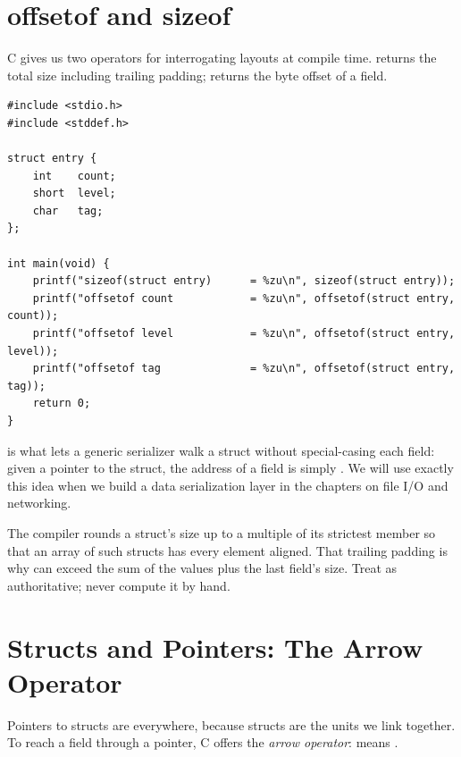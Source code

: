 \section{offsetof and sizeof}

C gives us two operators for interrogating layouts at compile time.
 returns the total size including trailing padding;
 returns the byte offset of a field.

\begin{lstlisting}[caption={Reading the layout without guessing.}]
#include <stdio.h>
#include <stddef.h>

struct entry {
    int    count;
    short  level;
    char   tag;
};

int main(void) {
    printf("sizeof(struct entry)      = %zu\n", sizeof(struct entry));
    printf("offsetof count            = %zu\n", offsetof(struct entry, count));
    printf("offsetof level            = %zu\n", offsetof(struct entry, level));
    printf("offsetof tag              = %zu\n", offsetof(struct entry, tag));
    return 0;
}
\end{lstlisting}

 is what lets a generic serializer walk a struct without
special-casing each field: given a pointer to the struct, the address
of a field is simply
. We will use
exactly this idea when we build a data serialization layer in the
chapters on file I/O and networking.

\begin{ruleofthumb}
The compiler rounds a struct's size up to a multiple of its strictest
member so that an array of such structs has every element aligned. That
trailing padding is why  can exceed the sum of the
 values plus the last field's size. Treat
 as authoritative; never compute it by hand.
\end{ruleofthumb}

\section{Structs and Pointers: The Arrow Operator}

Pointers to structs are everywhere, because structs are the units we
link together. To reach a field through a pointer, C offers the
\emph{arrow operator}:  means .

